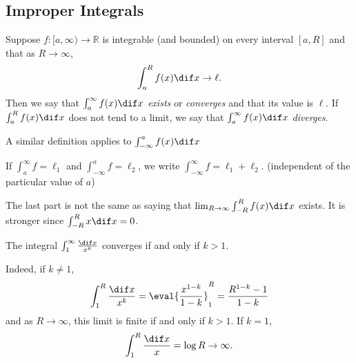 \subsection{Improper Integrals}
\begin{definition}[breakable]{}{}
    Suppose \(f:[a,\infty) \to \mathbb{R}\) is integrable (and bounded) on every interval \([a,R]\) and that as \(R \to \infty\),
    \[
        \int^R_a f(x) \dif x \to \ell.
    \]
    Then we say that \(\int^{\infty}_a f(x) \dif x\) \textit{exists} or \textit{converges} and that its value is \(\ell\). If \(\int^R_a f(x) \dif x\) does not tend to a limit, we say that \(\int^\infty_a f(x) \dif x\) \textit{diverges}.

    A similar definition applies to \(\int^a_{-\infty} f(x) \dif x\)

    If \(\int^\infty_a f =\ell_1\) and \(\int^a_{-\infty} f = \ell_2\), we write \(\int^\infty_{-\infty} f = \ell_1 + \ell_2\). (independent of the particular value of \(a\))
\end{definition}
\begin{remark}
    The last part is not the same as saying that \(\lim_{R \to \infty}\int^R_{-R}f(x) \dif x\) exists. It is stronger since \(\int^R_{-R} x \dif x = 0\).
\end{remark}
\begin{example}
    The integral \(\int^{\infty}_1 \frac{\dif x}{x^k}\) converges if and only if \(k > 1\).

    Indeed, if \(k\neq 1\),
    \[
        \int^R_1 \frac{\dif x}{x^k} = \eval{\frac{x^{1-k}}{1-k}}^R_1 = \frac{R^{1-k}-1}{1-k}
    \]
    and as \(R \to \infty\), this limit is finite if and only if \(k > 1\). If \(k = 1\),
    \[
        \int^R_1 \frac{\dif x}{x} = \log R \to \infty.
    \]
\end{example}
